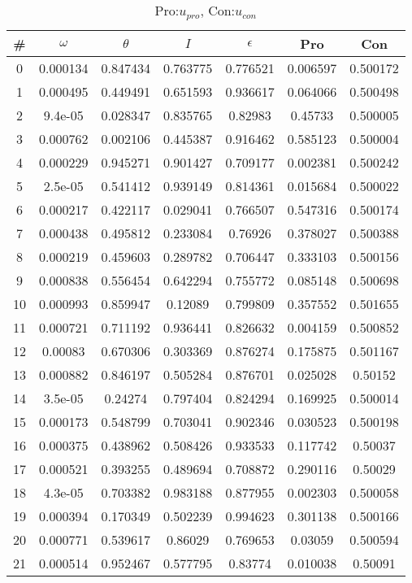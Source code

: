 \begin{table}
\caption{Pro:$u_{pro}$, Con:$u_{con}$}
\begin{tabular}{c|c|c|c|c|c|c}
\# & $\omega$ & $\theta$ & $I$ & $\epsilon$ & Pro & Con\\
\hline
0 & 0.000134 & 0.847434 & 0.763775 & 0.776521 & 0.006597 & 0.500172\\
1 & 0.000495 & 0.449491 & 0.651593 & 0.936617 & 0.064066 & 0.500498\\
2 & 9.4e-05 & 0.028347 & 0.835765 & 0.82983 & 0.45733 & 0.500005\\
3 & 0.000762 & 0.002106 & 0.445387 & 0.916462 & 0.585123 & 0.500004\\
4 & 0.000229 & 0.945271 & 0.901427 & 0.709177 & 0.002381 & 0.500242\\
5 & 2.5e-05 & 0.541412 & 0.939149 & 0.814361 & 0.015684 & 0.500022\\
6 & 0.000217 & 0.422117 & 0.029041 & 0.766507 & 0.547316 & 0.500174\\
7 & 0.000438 & 0.495812 & 0.233084 & 0.76926 & 0.378027 & 0.500388\\
8 & 0.000219 & 0.459603 & 0.289782 & 0.706447 & 0.333103 & 0.500156\\
9 & 0.000838 & 0.556454 & 0.642294 & 0.755772 & 0.085148 & 0.500698\\
10 & 0.000993 & 0.859947 & 0.12089 & 0.799809 & 0.357552 & 0.501655\\
11 & 0.000721 & 0.711192 & 0.936441 & 0.826632 & 0.004159 & 0.500852\\
12 & 0.00083 & 0.670306 & 0.303369 & 0.876274 & 0.175875 & 0.501167\\
13 & 0.000882 & 0.846197 & 0.505284 & 0.876701 & 0.025028 & 0.50152\\
14 & 3.5e-05 & 0.24274 & 0.797404 & 0.824294 & 0.169925 & 0.500014\\
15 & 0.000173 & 0.548799 & 0.703041 & 0.902346 & 0.030523 & 0.500198\\
16 & 0.000375 & 0.438962 & 0.508426 & 0.933533 & 0.117742 & 0.50037\\
17 & 0.000521 & 0.393255 & 0.489694 & 0.708872 & 0.290116 & 0.50029\\
18 & 4.3e-05 & 0.703382 & 0.983188 & 0.877955 & 0.002303 & 0.500058\\
19 & 0.000394 & 0.170349 & 0.502239 & 0.994623 & 0.301138 & 0.500166\\
20 & 0.000771 & 0.539617 & 0.86029 & 0.769653 & 0.03059 & 0.500594\\
21 & 0.000514 & 0.952467 & 0.577795 & 0.83774 & 0.010038 & 0.50091\\

\end{tabular}
\end{table}

